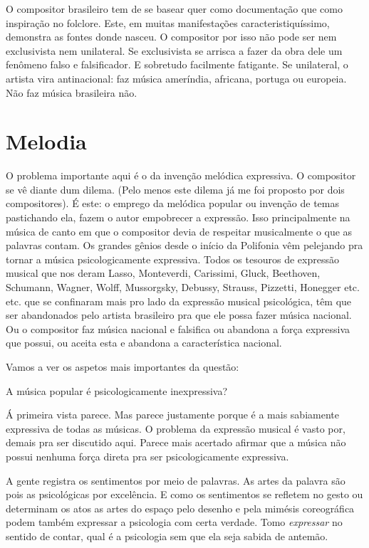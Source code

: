 O compositor brasileiro tem de se basear quer como documentação que como
inspiração no folclore. Este, em muitas manifestações
caracteristiquíssimo, demonstra as fontes donde nasceu. O compositor por
isso não pode ser nem exclusivista nem unilateral. Se exclusivista se
arrisca a fazer da obra dele um fenômeno falso e falsificador. E
sobretudo facilmente fatigante. Se unilateral, o artista vira
antinacional: faz música ameríndia, africana, portuga ou europeia. Não
faz música brasileira não.

\section{Melodia}

O problema importante aqui é o da invenção melódica expressiva. O
compositor se vê diante dum dilema. (Pelo menos este dilema já me foi
proposto por dois compositores). É este: o emprego da melódica popular
ou invenção de temas pastichando ela, fazem o autor empobrecer a
expressão. Isso principalmente na música de canto em que o compositor
devia de respeitar musicalmente o que as palavras contam. Os grandes
gênios desde o início da Polifonia vêm pelejando pra tornar a música
psicologicamente expressiva. Todos os tesouros de expressão musical que
nos deram Lasso, Monteverdi, Carissimi, Gluck, Beethoven, Schumann,
Wagner, Wolff, Mussorgsky, Debussy, Strauss, Pizzetti, Honegger etc.
etc. que se confinaram mais pro lado da expressão musical psicológica,
têm que ser abandonados pelo artista brasileiro pra que ele possa fazer
música nacional. Ou o compositor faz música nacional e falsifica ou
abandona a força expressiva que possui, ou aceita esta e abandona a
característica nacional.

Vamos a ver os aspetos mais importantes da questão:

A música popular é psicologicamente inexpressiva?

Á primeira vista parece. Mas parece justamente porque é a mais
sabiamente expressiva de todas as músicas. O problema da expressão
musical é vasto por, demais pra ser discutido aqui. Parece mais acertado
afirmar que a música não possui nenhuma força direta pra ser
psicologicamente expressiva.

A gente registra os sentimentos por meio de palavras. As artes da
palavra são pois as psicológicas por excelência. E como os sentimentos
se refletem no gesto ou determinam os atos as artes do espaço pelo
desenho e pela mimésis coreográfica podem também expressar a psicologia
com certa verdade. Tomo \textit{expressar} no sentido de contar, qual é a
psicologia sem que ela seja sabida de antemão.

